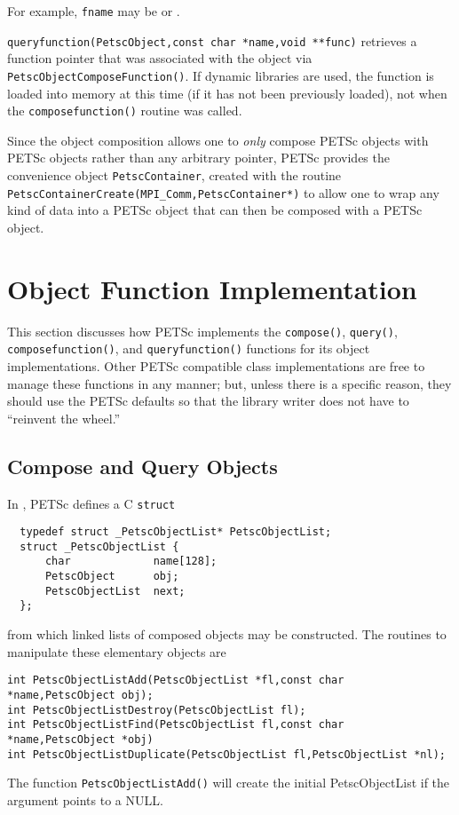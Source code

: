 \begin{tightitemize}
      For example, \lstinline{fname} may be  or
      .

\item \lstinline{queryfunction(PetscObject,const char *name,void **func)} retrieves a function pointer that
      was associated with the object via \lstinline{PetscObjectComposeFunction()}. If dynamic libraries are used, the function is loaded
      into memory at this time (if it has not been previously loaded), not when the
      \lstinline{composefunction()} routine was called.

\end{tightitemize}

Since the object composition allows one to {\em only} compose PETSc objects
with PETSc objects rather than any arbitrary pointer, PETSc provides
the convenience object \lstinline{PetscContainer}, created with the
routine \lstinline{PetscContainerCreate(MPI_Comm,PetscContainer*)}
to allow one to wrap any kind of data into a PETSc object that can then be
composed with a PETSc object.

\section{Object Function Implementation}

This section discusses how PETSc implements the \lstinline{compose()}, \lstinline{query()}, 
\lstinline{composefunction()}, and \lstinline{queryfunction()} functions for its object implementations.
Other PETSc compatible class implementations are free to manage these functions in any
manner; but, unless there is a specific reason, they should use the PETSc defaults so that the library writer does
not have to ``reinvent the wheel.''

\subsection{Compose and Query Objects}
In \href{http://www.mcs.anl.gov/petsc/petsc-master/src/objects/olist.c.html}{}, PETSc defines a C \lstinline{struct}
\begin{lstlisting}
  typedef struct _PetscObjectList* PetscObjectList;
  struct _PetscObjectList {
      char             name[128];
      PetscObject      obj;
      PetscObjectList  next;
  };
\end{lstlisting}
from which linked lists of composed objects may be constructed. The routines
to manipulate these elementary objects are
\begin{lstlisting}
int PetscObjectListAdd(PetscObjectList *fl,const char *name,PetscObject obj);
int PetscObjectListDestroy(PetscObjectList fl);
int PetscObjectListFind(PetscObjectList fl,const char *name,PetscObject *obj)
int PetscObjectListDuplicate(PetscObjectList fl,PetscObjectList *nl);
\end{lstlisting}
The function \lstinline{PetscObjectListAdd()} will create the initial PetscObjectList if the argument
 points to a NULL.

